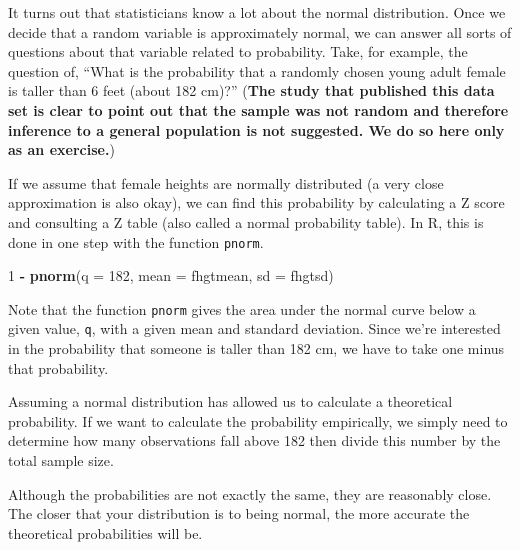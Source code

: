\documentclass[]{book}
\newenvironment{Shaded}{\begin{snugshade}}{\end{snugshade}}
\newcommand{\KeywordTok}[1]{\textcolor[rgb]{0.13,0.29,0.53}{\textbf{#1}}}
\newcommand{\DataTypeTok}[1]{\textcolor[rgb]{0.13,0.29,0.53}{#1}}
\newcommand{\DecValTok}[1]{\textcolor[rgb]{0.00,0.00,0.81}{#1}}
\newcommand{\StringTok}[1]{\textcolor[rgb]{0.31,0.60,0.02}{#1}}
\newcommand{\OperatorTok}[1]{\textcolor[rgb]{0.81,0.36,0.00}{\textbf{#1}}}
\newcommand{\NormalTok}[1]{#1}
\theoremstyle{definition}
\theoremstyle{definition}
\theoremstyle{definition}
\theoremstyle{remark}
\begin{document}
It turns out that statisticians know a lot about the normal
distribution. Once we decide that a random variable is approximately
normal, we can answer all sorts of questions about that variable related
to probability. Take, for example, the question of, ``What is the
probability that a randomly chosen young adult female is taller than 6
feet (about 182 cm)?'' (\textbf{The study that published this data set
is clear to point out that the sample was not random and therefore
inference to a general population is not suggested. We do so here only
as an exercise.})

If we assume that female heights are normally distributed (a very close
approximation is also okay), we can find this probability by calculating
a Z score and consulting a Z table (also called a normal probability
table). In R, this is done in one step with the function \texttt{pnorm}.

\begin{Shaded}
\begin{Highlighting}[]
\DecValTok{1} \OperatorTok{-}\StringTok{ }\KeywordTok{pnorm}\NormalTok{(}\DataTypeTok{q =} \DecValTok{182}\NormalTok{, }\DataTypeTok{mean =}\NormalTok{ fhgtmean, }\DataTypeTok{sd =}\NormalTok{ fhgtsd)}
\end{Highlighting}
\end{Shaded}

Note that the function \texttt{pnorm} gives the area under the normal
curve below a given value, \texttt{q}, with a given mean and standard
deviation. Since we're interested in the probability that someone is
taller than 182 cm, we have to take one minus that probability.

Assuming a normal distribution has allowed us to calculate a theoretical
probability. If we want to calculate the probability empirically, we
simply need to determine how many observations fall above 182 then
divide this number by the total sample size.

\begin{Shaded}
\end{Shaded}

Although the probabilities are not exactly the same, they are reasonably
close. The closer that your distribution is to being normal, the more
accurate the theoretical probabilities will be.
\end{document}

